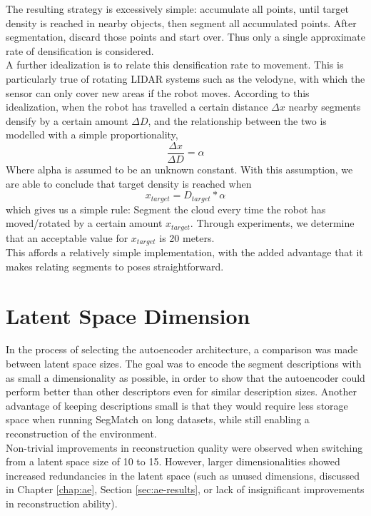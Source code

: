 The resulting strategy is excessively simple: accumulate all points, until target density is reached in nearby objects, then segment all accumulated points. After segmentation, discard those points and start over. Thus only a single approximate rate of densification is considered.\\

A further idealization is to relate this densification rate to movement. This is particularly true of rotating LIDAR systems such as the velodyne, with which the sensor can only cover new areas if the robot moves.  
According to this idealization, when the robot has travelled a certain distance $\Delta x$ nearby segments densify by a certain amount $\Delta D$, and the relationship between the two is modelled with a simple proportionality,
$$\frac{\Delta x}{\Delta D} = \alpha$$
Where alpha is assumed to be an unknown constant. With this assumption, we are able to conclude that target density is reached when
$$x_{target} = D_{target} * \alpha$$
which gives us a simple rule: Segment the cloud every time the robot has moved/rotated by a certain amount $x_{target}$. Through experiments, we determine that an acceptable value for $x_{target}$ is 20 meters.\\

This affords a relatively simple implementation, with the added advantage that it makes relating segments to poses straightforward.\\



\section{Latent Space Dimension}
\label{sec:latent_space_size}

In the process of selecting the autoencoder architecture, a comparison was made between latent space sizes. The goal was to encode the segment descriptions with as small a dimensionality as possible, in order to show that the autoencoder could perform better than other descriptors even for similar description sizes. Another advantage of keeping descriptions small is that they would require less storage space when running SegMatch on long datasets, while still enabling a reconstruction of the environment.\\

Non-trivial improvements in reconstruction quality were observed when switching from a latent space size of 10 to 15. However, larger dimensionalities showed increased redundancies in the latent space (such as unused dimensions, discussed in Chapter \ref{chap:ae}, Section \ref{sec:ae-results}, or lack of insignificant improvements in reconstruction ability).\\


